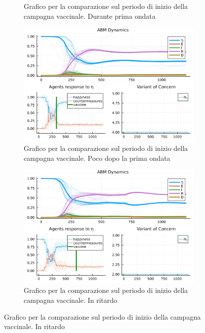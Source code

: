 \begin{figure}[H]
\begin{subfigure}[b]{0.45\textwidth}
		\caption{Grafico per la comparazione sul periodo di inizio della campagna vaccinale. Durante prima ondata}
		\label{fig:comparison_all_2}
	\end{subfigure}
	\hfill
	\begin{subfigure}[b]{0.45\textwidth}
		\centering
		\includegraphics[width=\textwidth]{img/SocialNetworkABM_4_A.jpg}
		\caption{Grafico per la comparazione sul periodo di inizio della campagna vaccinale. Poco dopo la prima ondata}
		\label{fig:comparison_all_3}
	\end{subfigure}
	\hfill
	\begin{subfigure}[b]{0.45\textwidth}
		\centering
		\includegraphics[width=\textwidth]{img/SocialNetworkABM_2_A.jpg}
		\caption{Grafico per la comparazione sul periodo di inizio della campagna vaccinale. In ritardo}
		\label{fig:comparison_all_4}
	\end{subfigure}
\end{figure}
\newpage

